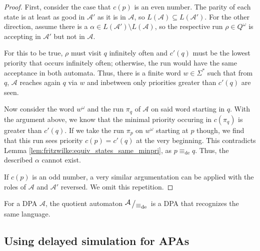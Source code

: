 \begin{proof}
	First, consider the case that $c(p)$ is an even number. The parity of each state is at least as good in $\mathcal{A}'$ as it is in $\mathcal{A}$, so $L(\mathcal{A}) \subseteq L(\mathcal{A}')$. For the other direction, assume there is a $\alpha \in L(\mathcal{A}') \setminus L(\mathcal{A})$, so the respective run $\rho \in Q^\omega$ is accepting in $\mathcal{A}'$ but not in $\mathcal{A}$. 
	
	For this to be true, $\rho$ must visit $q$ infinitely often and $c'(q)$ must be the lowest priority that occurs infinitely often; otherwise, the run would have the same acceptance in both automata. Thus, there is a finite word $w \in \Sigma^*$ such that from $q$, $\mathcal{A}$ reaches again $q$ via $w$ and inbetween only priorities greater than $c'(q)$ are seen.
	
	Now consider the word $w^\omega$ and the run $\pi_q$ of $\mathcal{A}$ on said word starting in $q$. With the argument above, we know that the minimal priority occuring in $c(\pi_q)$ is greater than $c'(q)$. If we take the run $\pi_p$ on $w^\omega$ starting at $p$ though, we find that this run sees priority $c(p) = c'(q)$ at the very beginning. This contradicts Lemma \ref{lem:fritzwilke:equiv_states_same_minpri}, as $p \equiv_\text{de} q$. Thus, the described $\alpha$ cannot exist. 
	
	If $c(p)$ is an odd number, a very similar argumentation can be applied with the roles of $\mathcal{A}$ and $\mathcal{A}'$ reversed. We omit this repetition.
\end{proof}

\begin{cor}
	For a DPA $\mathcal{A}$, the quotient automaton $\bigslant{\mathcal{A}}{\equiv_\text{de}}$ is a DPA that recognizes the same language.
\end{cor}


\subsection{Using delayed simulation for APAs}











